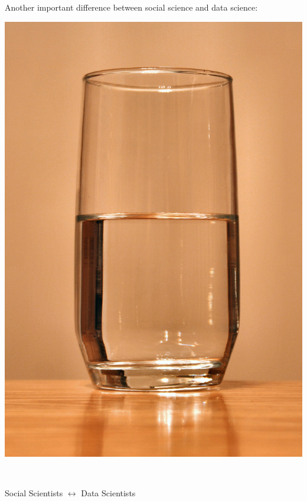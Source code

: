 \documentclass{beamer}
\def\vf{\vfill}
\begin{document}
\begin{frame}

Another important difference between social science and data science:
\begin{center}
\includegraphics[height=0.7\textheight]{figures/glass-of-water.jpg}
\end{center}

\vf
\vspace{0.5in}
\\
\end{frame}
\begin{frame}

\begin{center}
\LARGE{Social Scientists $\longleftrightarrow$ Data Scientists}
\end{center}

\end{frame}
\end{document}
